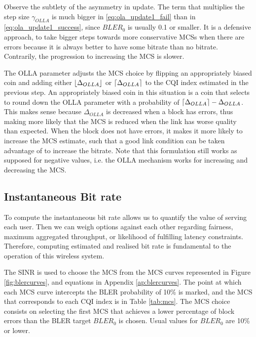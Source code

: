 Observe the subtlety of the asymmetry in update. The term that multiplies the step size $\gamma_{OLLA}$ is much bigger in \eqref{eq:ola_update1_fail} than in \eqref{eq:ola_update1_success}, since $BLER_0$ is usually 0.1 or smaller. It is a defensive approach, to take bigger steps towards more conservative MCSs when there are errors because it is always better to have some bitrate than no bitrate. Contrarily, the progression to increasing the MCS is slower. 


The OLLA parameter adjusts the MCS choice by flipping an appropriately biased coin and adding either $\lfloor\Delta_{OLLA}\rfloor$ or $\lceil\Delta_{OLLA}\rceil$ to the CQI index estimated in the previous step. An appropriately biased coin in this situation is a coin that selects to round down the OLLA parameter with a probability of $\lceil\Delta_{OLLA}\rceil - \Delta_{OLLA}$. This makes sense because $\Delta_{OLLA}$ is decreased when a block has errors, thus making more likely that the MCS is reduced when the link has worse quality than expected. When the block does not have errors, it makes it more likely to increase the MCS estimate, such that a good link condition can be taken advantage of to increase the bitrate. Note that this formulation still works as supposed for negative values, i.e. the OLLA mechanism works for increasing and decreasing the MCS.


\subsection*{Instantaneous Bit rate}

To compute the instantaneous bit rate allows us to quantify the value of serving each user. Then we can weigh options against each other regarding fairness, maximum aggregated throughput, or likelihood of fulfilling latency constraints. Therefore, computing estimated and realised bit rate is fundamental to the operation of this wireless system.

The SINR is used to choose the MCS from the MCS curves represented in Figure \ref{fig:blercurves}, and equations in Appendix \ref{ap:blercurves}. The point at which each MCS curve intercepts the BLER probability of 10\% is marked, and the MCS that corresponds to each CQI index is in Table \ref{tab:mcs}. The MCS choice consists on selecting the first MCS that achieves a lower percentage of block errors than the \ac{BLER} target $BLER_0$ is chosen. Usual values for $BLER_0$ are 10\% or lower. 




